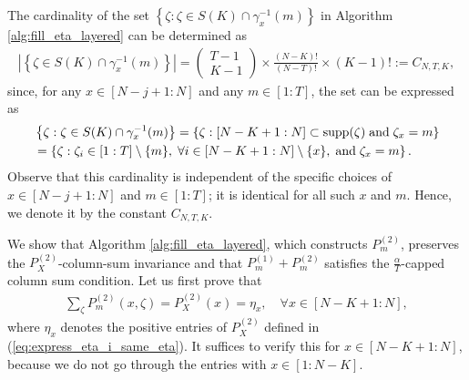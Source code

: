 \documentclass[11pt,letterpaper]{article}
\newcommand{\supp}{\mathrm{supp}}
\begin{document}
The cardinality of the set $\left\{\zeta: \zeta \in S(K) \cap \gamma_x^{-1}(m) \right\}$ in Algorithm \ref{alg:fill_eta_layered} can be determined as
\begin{align}
    \left\lvert \left\{\zeta \in  S(K) \cap \gamma_x^{-1}(m) \right\} \right\rvert 
    = \left( \begin{gathered}T-1\\ K-1\end{gathered} \right)  \times \frac{(N-K)!}{(N-T)!} \times (K-1)! := C_{N,T,K},
\end{align}
since, for any $x \in [N-j+1:N]$ and any $m \in [1:T]$, the set can be expressed as
\begin{align}
    & \left\{\zeta: \zeta \in  S(K) \cap \gamma_x^{-1}(m) \right\}
    = \left\{ \zeta: [N-K+1:N] \subset \supp(\zeta) \;\text{and}\; \zeta_x = m \right\} \notag \\
 & = \left\{\zeta: \zeta_i \in [1:T]\setminus \{m\},\; \forall i \in [N-K+1:N]\setminus \{x\},\;\text{and}\; \zeta_x = m \right\}.
\end{align}
Observe that this cardinality is independent of the specific choices of $x \in [N-j+1:N]$ and $m \in [1:T]$; it is identical for all such $x$ and $m$. Hence, we denote it by the constant $C_{N,T,K}$.


We show that Algorithm \ref{alg:fill_eta_layered}, which constructs $P^{(2)}_m$, preserves the $P_X^{(2)}$-column-sum invariance and that $P^{(1)}_m+P^{(2)}_m$ satisfies the $\tfrac{\alpha}{T}$-capped column sum condition. Let us first prove that
\begin{align}
    \sum_\zeta P_m^{(2)}(x, \zeta) = P_X^{(2)}(x) = \eta_x,\quad \forall x \in [N-K+1:N], \label{eq:goal_fill_layered_eta}
\end{align}
where $\eta_x$ denotes the positive entries of $P_X^{(2)}$ defined in (\ref{eq:express_eta_i_same_eta}). It suffices to verify this for $x \in [N-K+1:N]$, because we do not go through the entries with $x \in [1:N-K]$.
\end{document}
